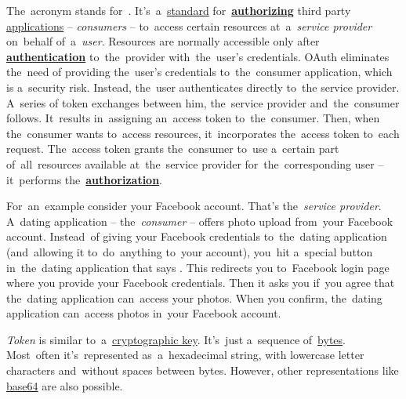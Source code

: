 The~acronym stands for~.
It's~a~\hyperref[protocolstandard]{standard} for~\hyperref[authenticationauthorization]{\textbf{authorizing}} third party \hyperref[applicationprocessprogramservicethread]{applications} -- \textit{consumers} -- to~access certain resources at~a~\textit{service provider} on~behalf of~a~\textit{user}.
Resources are normally accessible only after \hyperref[authenticationauthorization]{\textbf{authentication}} to~the~provider with~the~user's credentials.
OAuth eliminates the~need of providing the~user's credentials to~the~consumer application, which is a~security risk.
Instead, the~user authenticates directly to~the service provider.
A~series of token exchanges between him, the~service provider and~the~consumer follows.
It~results in~assigning an~access token to~the~consumer.
Then, when the~consumer wants to~access resources, it~incorporates the~access token to~each request.
The~access token grants the~consumer to~use a~certain part of~all~resources available at~the~service provider for~the~corresponding user -- it~performs the~\hyperref[authenticationauthorization]{\textbf{authorization}}.

For~an~example consider your Facebook account.
That's the~\textit{service provider}.
A~dating application -- the~\textit{consumer} -- offers photo upload from~your Facebook account.
Instead~of giving your Facebook credentials to~the~dating application (and~allowing it to~do~anything to~your account), you~hit a~special button in~the~dating application that says .
This redirects you to~Facebook login page where you provide your Facebook credentials.
Then it asks you if~you agree that the~dating application can~access your photos.
When you confirm, the~dating application can~access photos in~your Facebook account.

\textit{Token} is similar to~a~\hyperref[key]{cryptographic key}.
It's~just a~sequence of~\hyperref[bitsandbytes]{bytes}.
Most~often it's~represented as~a~hexadecimal string, with lowercase letter characters and~without spaces between bytes.
However, other representations like \hyperref[base64]{base64} are also possible.


